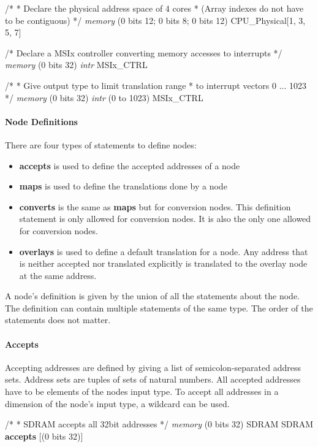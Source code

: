 \documentclass[a4paper,11pt,twoside]{report}
\begin{document}
{{{\begin{example}
  /* 
   * Declare the physical address space of 4 cores
   * (Array indexes do not have to be contiguous)
   */
  \textit{memory} (0 bits 12; 0 bits 8; 0 bits 12) CPU_Physical[1, 3, 5, 7]

  /* Declare a MSIx controller converting memory accesses to interrupts */
  \textit{memory} (0 bits 32) \textit{intr} MSIx_CTRL

  /*
   * Give output type to limit translation range
   * to interrupt vectors 0 ... 1023
   */
  \textit{memory} (0 bits 32) \textit{intr} (0 to 1023) MSIx_CTRL
\end{example}

\paragraph{Node Definitions}
There are four types of statements to define nodes:
\begin{itemize}
  \item \textbf{accepts} is used to define the accepted addresses of a node
  \item \textbf{maps} is used to define the translations done by a node
  \item \textbf{converts} is the same as \textbf{maps} but for conversion nodes.
  This definition statement is only allowed for conversion nodes.
  It is also the only one allowed for conversion nodes.
  \item \textbf{overlays} is used to define a default translation for a node.
  Any address that is neither accepted nor translated explicitly is translated to the overlay node at the same address.
\end{itemize}
A node's definition is given by the union of all the statements about the node.
The definition can contain multiple statements of the same type.
The order of the statements does not matter.

\paragraph{Accepts}
Accepting addresses are defined by giving a list of semicolon-separated address sets.
Address sets are tuples of sets of natural numbers.
All accepted addresses have to be elements of the nodes input type.
To accept all addresses in a dimension of the node's input type, a wildcard can be used.
\begin{example}
  /*
   * SDRAM accepts all 32bit addresses
   */
  \textit{memory} (0 bits 32) SDRAM
  SDRAM \textbf{accepts} [(0 bits 32)]


\end{example}}}}
\end{document}
